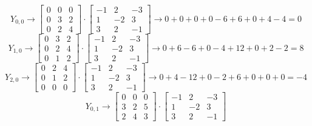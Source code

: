 \documentclass{article}
\begin{document}
{\begin{equation}
    Y_{0,0} \rightarrow
    \begin{bmatrix}
        0&0&0\\
        0&3&2\\
        0&2&4
    \end{bmatrix}
    \cdot 
    \begin{bmatrix}
        -1&2&-3\\
        1&-2&3\\
        3&2&-1
    \end{bmatrix}
    \rightarrow 0+0+0+0-6+6+0+4-4=0
\end{equation}
\begin{equation}
    Y_{1,0} \rightarrow
    \begin{bmatrix}
        0&3&2\\
        0&2&4\\
        0&1&2
    \end{bmatrix}
    \cdot 
    \begin{bmatrix}
        -1&2&-3\\
        1&-2&3\\
        3&2&-1
    \end{bmatrix}
    \rightarrow 0+6-6+0-4+12+0+2-2=8
\end{equation}
\begin{equation}
    Y_{2,0} \rightarrow
    \begin{bmatrix}
        0&2&4\\
        0&1&2\\
        0&0&0
    \end{bmatrix}
    \cdot 
    \begin{bmatrix}
        -1&2&-3\\
        1&-2&3\\
        3&2&-1
    \end{bmatrix}
    \rightarrow 0+4-12+0-2+6+0+0+0=-4
\end{equation}
\begin{equation}
    Y_{0,1} \rightarrow
    \begin{bmatrix}
        0&0&0\\
        3&2&5\\
        2&4&3
    \end{bmatrix}
    \cdot 
    \begin{bmatrix}
        -1&2&-3\\
        1&-2&3\\
        3&2&-1
    \end{bmatrix}

\end{equation}}
\end{document}
